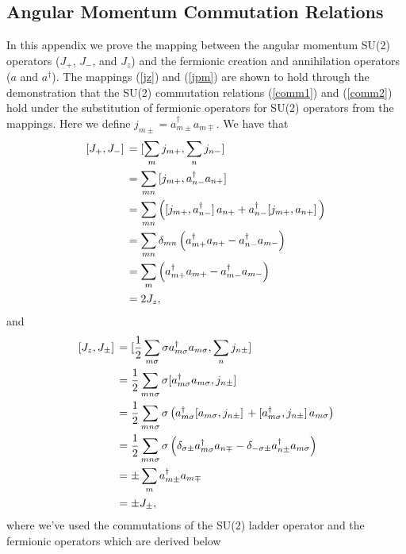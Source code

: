 \documentclass[10pt]{article}
\begin{document}
\begin{appendices}

\chapter{Angular Momentum Commutation Relations} 
\label{appendix:angular_momentum_commutation_relations}

In this appendix we prove the mapping between the angular momentum SU(2) operators ($J_+$, $J_-$, and $J_z$) and the fermionic creation and annihilation operators ($a$ and $a^\dagger$). The mappings (\ref{jz}) and (\ref{jpm}) are shown to hold through the demonstration that the SU(2) commutation relations (\ref{comm1}) and (\ref{comm2}) hold under the substitution of fermionic operators for SU(2) operators from the mappings. Here we define $j_{m\pm}= a^\dagger_{m\pm}a_{m\mp}$. We have that
\begin{align}
\comm*{J_+}{J_-}
&=
\comm*{\sum_mj_{m+}}{\sum_nj_{n-}}
\nonumber
\\
&=
\sum_{mn}\comm*{j_{m+}}{a^{\dagger}_{n-}a_{n+}}
\nonumber
\\
&=
\sum_{mn}\left(\comm*{j_{m+}}{a^{\dagger}_{n-}}a_{n+}+a^{\dagger}_{n-}\comm*{j_{m+}}{a_{n+}}\right)
\nonumber
\\
&=
\sum_{mn}\delta_{mn}\left(a^{\dagger}_{m+}a_{n+}-a^{\dagger}_{n-}a_{m-}\right)
\nonumber
\\
&=
\sum_{m}\left(a^{\dagger}_{m+}a_{m+}-a^{\dagger}_{m-}a_{m-}\right)
\nonumber
\\
&=2J_z,
\end{align}
and
\begin{align}
\comm*{J_z}{J_\pm}
&=
\comm*{\frac{1}{2}\sum_{m\sigma}\sigma a^{\dagger}_{m\sigma}a_{m\sigma}}{\sum_{n}j_{n\pm}}
\nonumber
\\
&=
\frac{1}{2}\sum_{mn\sigma}\sigma\comm*{a^{\dagger}_{m\sigma}a_{m\sigma}}{j_{n\pm}}
\nonumber
\\
&=
\frac{1}{2}\sum_{mn\sigma}\sigma
\left(
a^{\dagger}_{m\sigma}\comm*{a_{m\sigma}}{j_{n\pm}}
+
\comm*{a^{\dagger}_{m\sigma}}{j_{n\pm}}a_{m\sigma}
\right)
\nonumber
\\
&=
\frac{1}{2}\sum_{mn\sigma}\sigma
\left(
\delta_{\sigma\pm}a^{\dagger}_{m\sigma}a_{n\mp}
-
\delta_{-\sigma\pm}a^{\dagger}_{n\pm}a_{m\sigma}\right)
\nonumber
\\
&=
\pm\sum_ma^{\dagger}_{m\pm}a_{m\mp}
\nonumber
\\
&=
\pm J_{\pm},
\end{align}
where we've used the commutations of the SU(2) ladder operator and the fermionic operators which are derived below

\end{appendices}
\end{document}
